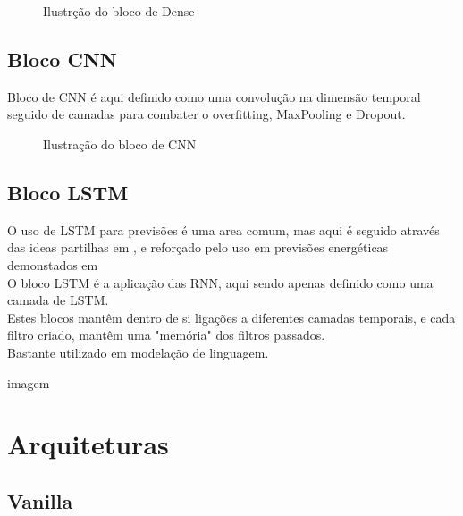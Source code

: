 \begin{figure}[H]
	\centering
	\resizebox{\linewidth}{!}{}
	\caption{Ilustrção do bloco de Dense}
	\label{fig:dense_block}
\end{figure}




\subsection{Bloco CNN\label{se:cnn}}

Bloco de CNN é aqui definido como uma convolução na dimensão temporal seguido de camadas para combater o overfitting, MaxPooling e Dropout. \\




\begin{figure}[H]
	\centering
	\resizebox{\linewidth}{!}{}
	\caption{Ilustração do bloco de CNN}
	\label{fig:cnn_block}
\end{figure}



\subsection{Bloco LSTM\label{se:lstm}}

O uso de LSTM para previsões é uma area comum, mas aqui é seguido através das ideas partilhas em \cite{Hewamalage2021}, e reforçado pelo uso em previsões energéticas demonstados em \cite{Costa2022} \\
O bloco LSTM é a aplicação das RNN, aqui sendo apenas definido como uma camada de LSTM. \\
Estes blocos mantêm dentro de si ligações a diferentes camadas temporais, e cada filtro criado, mantêm uma "memória" dos filtros passados. \\
Bastante utilizado em modelação de linguagem.

imagem


\section{Arquiteturas \label{se:arquitecturas}}

\subsection{Vanilla \label{se:vannila}}

